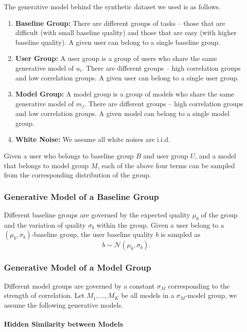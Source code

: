 \documentclass[letterpaper]{vldb}
\begin{document}
The generative model behind the synthetic dataset we used is as follows.

\begin{enumerate}
\item {\bf Baseline Group:} There are different groups of tasks -- those that are difficult (with small
baseline quality) and those that are easy (with higher baseline quality). A given user can belong
to a single baseline group.
\item {\bf User Group:} A user group is a group of users who share the
same generative model of $u_i$. There are different groups -- high correlation groups
and low correlation groups. A given user can belong to a single user group.
\item {\bf Model Group:} A model group is a group of models who share
the same generative model of $m_j$. There are different groups -- high correlation groups
and low correlation groups. A given model can belong to a single model group.
\item {\bf White Noise:} We assume all white noises are i.i.d.
\end{enumerate}

Given a user who belongs to baseline group $B$ and user group $U$,
and a model that belongs to model group $M$, each of the above four terms
can be sampled from the corresponding distribution of the group.

\subsubsection{Generative Model of a Baseline Group}

Different baseline groups are governed by the expected quality $\mu_b$ of the group
and the variation of quality $\sigma_b$ within the group. Given a user
belong to a $(\mu_b, \sigma_b)$-baseline group, the user baseline quality 
$b$ is sampled as
\[
b \sim \mathcal{N}(\mu_b, \sigma_b).
\]

\subsubsection{Generative Model of a Model Group}

Different model groups are governed by a constant $\sigma_M$ corresponding to
the strength of correlation. Let ${M_1,...,M_K}$ be all models in a
$\sigma_M$-model group, we assume the following generative models.

\paragraph*{Hidden Similarity between Models}
\end{document}
